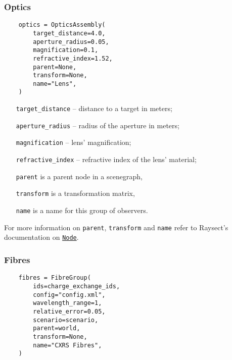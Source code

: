 \documentclass[../main.tex]{subfiles}
\begin{document}
\subsubsection{Optics}%
\label{sec:optics}

\begin{verbatim}
    optics = OpticsAssembly(
        target_distance=4.0,
        aperture_radius=0.05,
        magnification=0.1,
        refractive_index=1.52,
        parent=None,
        transform=None,
        name="Lens",
    )
\end{verbatim}

\begin{itemize}[align=left]
    \item[\texttt{target\_distance}] -- distance to a target in meters;
    \item[\texttt{aperture\_radius}] -- radius of the aperture in meters;
    \item[\texttt{magnification}] -- lens' magnification;
    \item[\texttt{refractive\_index}] -- refractive index of the lens' material;
    \item[\texttt{parent}] is a parent node in a scenegraph,
    \item[\texttt{transform}] is a transformation matrix,
    \item[\texttt{name}] is a name for this group of observers.
\end{itemize}

For more information on \texttt{parent}, \texttt{transform} and \texttt{name} refer to Raysect's documentation on \href{https://raysect.github.io/documentation/api_reference/edge/raysect_edge_scenegraph.html?highlight=node#raysect.edge.scenegraph.node.Node}{\texttt{Node}}.

\subsubsection{Fibres}%
\label{sec:fibres}

\begin{verbatim}
    fibres = FibreGroup(
        ids=charge_exchange_ids,
        config="config.xml",
        wavelength_range=1,
        relative_error=0.05,
        scenario=scenario,
        parent=world,
        transform=None,
        name="CXRS Fibres",
    )
\end{verbatim}
\end{document}
